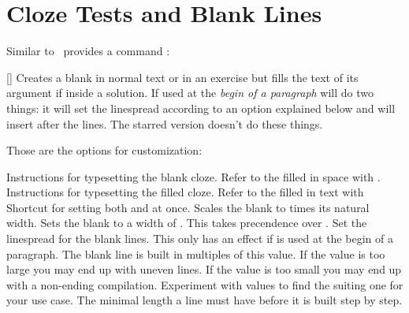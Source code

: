 \documentclass{xsim-manual}
\begin{document}
\section{Cloze Tests and Blank Lines}

Similar to  \xsim\ provides a command :
\begin{commands}
  [\sarg{}]
    Creates a blank in normal text or in an exercise but fills the text of its
    argument if inside a solution.  If used at the \emph{begin of a paragraph}
     will do two things: it will set the linespread according to an
    option explained below and will insert  after the lines.  The
    starred version doesn't do these things.
\end{commands}

Those are the options for customization:
\begin{options}
    Instructions for typesetting the blank cloze.  Refer to the filled in
    space with .
    Instructions for typesetting the filled cloze.  Refer to the filled in text
    with 
    Shortcut for setting both  and 
    at once.
\textsc{}    Scales the blank to  times its natural width.
  \Default
    Sets the blank to a width of .  This takes precendence over
    .
    Set the linespread for the blank lines. This only has an effect if
     is used at the begin of a paragraph.
    The blank line is built in multiples of this value.  If the value is too
    large you may end up with uneven lines.  If the value is too small you may
    end up with a non-ending compilation.  Experiment with values to find the
    suiting one for your use case.
  \Default{\code{2em}}
     The minimal length a line must have before it is built step by step.
\end{options}
\end{document}
